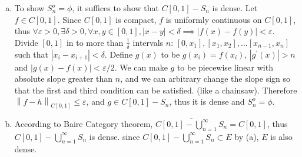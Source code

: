 \documentclass{report}
\def\ve{\varepsilon}
\def\abs#1{\left| #1 \right|}
\begin{document}
\begin{enumerate}[(a)]
    \item 
    To show $S_n^o = \phi$, it suffices to show that $C[0,1] - S_n$ is dense. 
    Let $f \in C[0,1]$.
    Since $C[0,1]$ is compact, $f$ is uniformly continuous on $C[0,1]$, thus 
    $\forall \ve > 0, \exists \delta > 0, \forall x, y \in [0, 1], 
    |x - y| < \delta \implies |f(x) - f(y)| < \ve$.
    Divide $[0,1]$ in to more than $\frac{1}{\delta}$ intervals $n$:
    $[0, x_1], [x_1, x_2], \ldots [x_{n-1}, x_n]$ such that $\abs{x_i - x_{i+1}} < \delta$.
    Define $g(x)$ to be $g(x_i) = f(x_i)$, $|g^\prime(x)| > n$ and $|g(x) - f(x)| < \ve / 2$.
    We can make $g$ to be piecewise linear with absolute slope greater than $n$, 
    and we can arbitrary change the slope sign so that the first and third condition can be satisfied.
    (like a chainsaw).
    Therefore $\left\| f - h\right\|_{C[0,1]}  \le \ve$, and $g \in C[0,1] - S_n$, thus it 
    is dense and $S_n^o = \phi$.

    \item 
    According to Baire Category theorem, $\overline{C[0, 1] - \bigcup_{n=1}^\infty S_n} = C[0,1]$,
    thus $C[0, 1] - \bigcup_{n=1}^\infty S_n$ is dense. since $C[0, 1] - \bigcup_{n=1}^\infty
    S_n \subset E$ by (a), $E$ is also dense.

    \end{enumerate}
    
\end{document}
